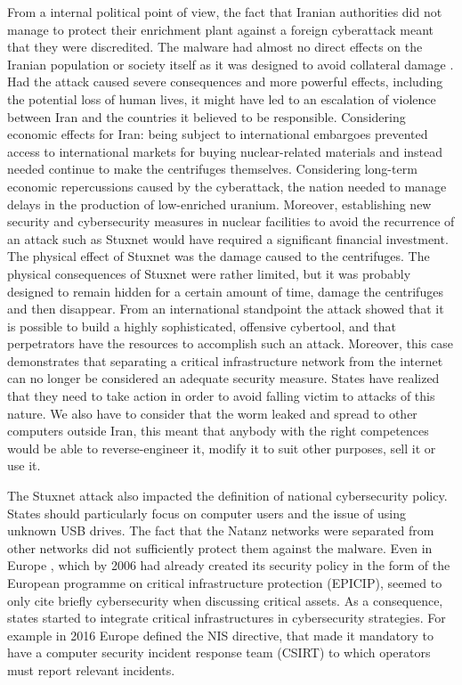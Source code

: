 \documentclass[12pt]{article}
\begin{document}
From a internal political point of view, the fact  that Iranian authorities did not manage to protect their enrichment plant against a foreign cyberattack meant that they were discredited.
The malware had almost no direct effects on the Iranian population or society itself as it was designed to avoid collateral damage \cite{rosenbaum}. Had the attack caused severe consequences and more powerful effects, including the potential loss of human lives, it might have led to an escalation of violence between Iran and the countries it believed to be responsible.
Considering economic effects for Iran: being subject to international embargoes prevented access to international markets for buying nuclear-related materials and instead needed continue to make the centrifuges themselves.
Considering long-term economic repercussions caused by the cyberattack, the nation needed to manage delays in the production of low-enriched uranium. Moreover, establishing new security and cybersecurity measures in nuclear facilities to avoid the recurrence of an attack such as Stuxnet would have required a significant financial investment. 
The physical effect of Stuxnet was the damage caused to the centrifuges.
The physical consequences of Stuxnet were rather limited, but it was probably designed to remain hidden for a certain amount of time, damage the centrifuges and then disappear.
From an international standpoint the attack showed that it is possible to build a highly sophisticated, offensive cybertool, and that perpetrators have the resources to accomplish such an attack. Moreover, this case demonstrates that separating a critical infrastructure network from the internet can no longer be considered an adequate security measure. States have realized that they need to take action in order to avoid falling victim to attacks of this nature.
We also have to consider that the worm leaked and spread to other computers outside Iran, this meant that anybody with the right competences would be able to reverse-engineer it, modify it to suit other purposes, sell it or use it.

The Stuxnet attack also impacted the definition of national cybersecurity policy.
States should particularly focus on computer users and the issue of using unknown USB drives.
The fact that the Natanz networks were separated from other networks did not sufficiently protect them against the malware. 
Even in Europe , which by 2006 had already created its security policy  in the form of the European programme on critical infrastructure protection (EPICIP), seemed to only cite briefly cybersecurity when discussing critical assets.
As a consequence, states started to integrate critical infrastructures in cybersecurity strategies.
For example in 2016 Europe defined the NIS directive, that made it mandatory to have a computer security incident response team (CSIRT) to which operators must report relevant incidents. 
\end{document}
